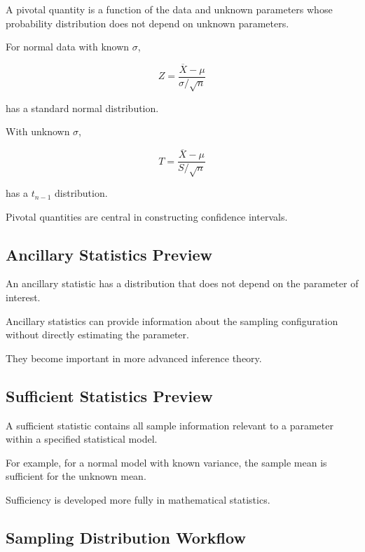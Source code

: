 A pivotal quantity is a function of the data and unknown parameters whose
probability distribution does not depend on unknown parameters.

For normal data with known \(\sigma\),

\[
\boxed{
Z
=
\frac{
\overline{X}-\mu
}{
\sigma/\sqrt{n}
}
}
\]

has a standard normal distribution.

With unknown \(\sigma\),

\[
\boxed{
T
=
\frac{
\overline{X}-\mu
}{
S/\sqrt{n}
}
}
\]

has a \(t_{n-1}\) distribution.

Pivotal quantities are central in constructing confidence intervals.

\subsection{Ancillary Statistics Preview}
\label{subsec:ancillary-statistics-preview}

An ancillary statistic has a distribution that does not depend on the
parameter of interest.

Ancillary statistics can provide information about the sampling
configuration without directly estimating the parameter.

They become important in more advanced inference theory.

\subsection{Sufficient Statistics Preview}
\label{subsec:sufficient-statistics-sampling-preview}

A sufficient statistic contains all sample information relevant to a
parameter within a specified statistical model.

For example, for a normal model with known variance, the sample mean is
sufficient for the unknown mean.

Sufficiency is developed more fully in mathematical statistics.

\subsection{Sampling Distribution Workflow}
\label{subsec:sampling-distribution-workflow}

